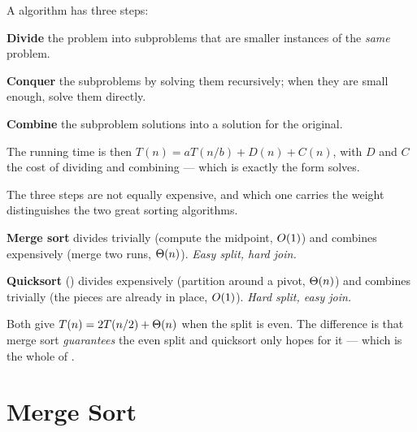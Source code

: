 \begin{definitionbox}
A  algorithm has three steps:

\begin{tightnum}
  \item \textbf{Divide} the problem into subproblems that are smaller instances
        of the \emph{same} problem.
  \item \textbf{Conquer} the subproblems by solving them recursively; when they
        are small enough, solve them directly.
  \item \textbf{Combine} the subproblem solutions into a solution for the
        original.
\end{tightnum}

\smallskip
The running time is then $T(n) = a T(n/b) + D(n) + C(n)$, with $D$ and $C$ the
cost of dividing and combining --- which is exactly the form 
solves.
\end{definitionbox}

\begin{conceptbox}
The three steps are not equally expensive, and which one carries the weight
distinguishes the two great sorting algorithms.

\smallskip
\textbf{Merge sort} divides trivially (compute the midpoint, $O(1)$) and
combines expensively (merge two runs, $\Theta(n)$). \emph{Easy split, hard
join.}

\smallskip
\textbf{Quicksort} () divides expensively (partition around a
pivot, $\Theta(n)$) and combines trivially (the pieces are already in place,
$O(1)$). \emph{Hard split, easy join.}

\smallskip
Both give $T(n) = 2T(n/2) + \Theta(n)$ when the split is even. The difference
is that merge sort \emph{guarantees} the even split and quicksort only hopes
for it --- which is the whole of .
\end{conceptbox}

\section{Merge Sort}


